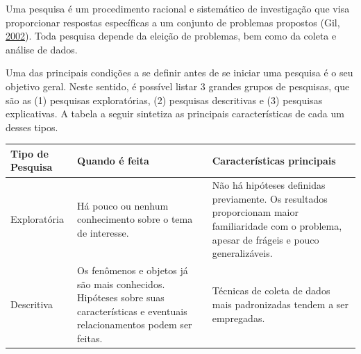 \documentclass[
]{book}
\begin{document}
Uma pesquisa é um procedimento racional e sistemático de investigação
que visa proporcionar respostas específicas a um conjunto de problemas
propostos (Gil, \protect\hyperlink{ref-gil2002}{2002}). Toda pesquisa
depende da eleição de problemas, bem como da coleta e análise de dados.

Uma das principais condições a se definir antes de se iniciar uma
pesquisa é o seu objetivo geral. Neste sentido, é possível listar 3
grandes grupos de pesquisas, que são as (1) pesquisas exploratórias, (2)
pesquisas descritivas e (3) pesquisas explicativas. A tabela a seguir
sintetiza as principais características de cada um desses tipos.

\begin{longtable}[]{@{}lll@{}}
\toprule
\begin{minipage}[b]{0.30\columnwidth}\raggedright
Tipo de Pesquisa\strut
\end{minipage} & \begin{minipage}[b]{0.30\columnwidth}\raggedright
Quando é feita\strut
\end{minipage} & \begin{minipage}[b]{0.30\columnwidth}\raggedright
Características principais\strut
\end{minipage}\tabularnewline
\midrule
\endhead
\begin{minipage}[t]{0.30\columnwidth}\raggedright
Exploratória\strut
\end{minipage} & \begin{minipage}[t]{0.30\columnwidth}\raggedright
Há pouco ou nenhum conhecimento sobre o tema de interesse.\strut
\end{minipage} & \begin{minipage}[t]{0.30\columnwidth}\raggedright
Não há hipóteses definidas previamente. Os resultados proporcionam maior
familiaridade com o problema, apesar de frágeis e pouco
generalizáveis.\strut
\end{minipage}\tabularnewline
\begin{minipage}[t]{0.30\columnwidth}\raggedright
Descritiva\strut
\end{minipage} & \begin{minipage}[t]{0.30\columnwidth}\raggedright
Os fenômenos e objetos já são mais conhecidos. Hipóteses sobre suas
características e eventuais relacionamentos podem ser feitas.\strut
\end{minipage} & \begin{minipage}[t]{0.30\columnwidth}\raggedright
Técnicas de coleta de dados mais padronizadas tendem a ser empregadas.

\end{minipage}
\end{longtable}
\end{document}
